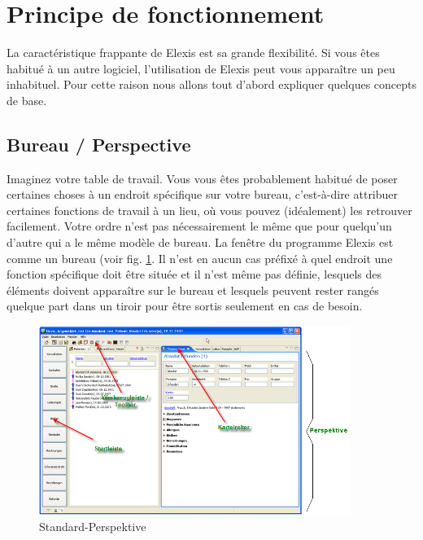 
\section{Principe de fonctionnement}
La caractéristique frappante de Elexis est sa grande flexibilité. Si vous êtes habitué à un
autre logiciel, l'utilisation de Elexis peut vous apparaître un peu inhabituel. Pour cette raison nous allons tout d'abord expliquer quelques concepts de base.

 \subsection{Bureau / Perspective}
Imaginez votre table de travail. Vous vous êtes probablement habitué de poser certaines choses à un endroit spécifique sur votre bureau, c'est-à-dire attribuer certaines fonctions de travail à un lieu, où vous pouvez (idéalement) les retrouver facilement. Votre ordre n'est pas nécessairement le même que pour quelqu'un d'autre qui a le même modèle de bureau.
La fenêtre du programme Elexis est comme un bureau (voir fig. \ref{fig:tour1}. Il n'est en aucun cas préfixé à quel endroit une fonction spécifique doit être située et il n'est même pas définie,
lesquels des éléments doivent apparaître sur le bureau et lesquels peuvent rester rangés quelque part dans un tiroir pour être sortis seulement en cas de besoin.


\begin{figure}[htp]
\begin{center}
  \includegraphics[width=0.9\textwidth]{images/tour1}
  \caption{Standard-Perspektive}
  \label{fig:tour1}
\end{center}
\end{figure}

